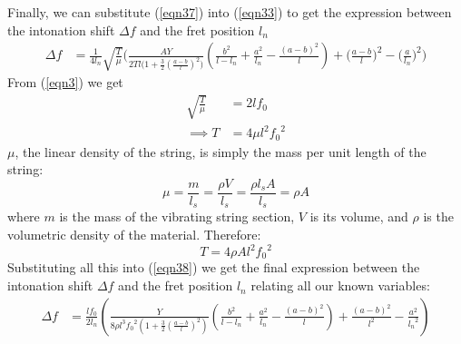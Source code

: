 Finally, we can substitute (\ref{eqn37}) into (\ref{eqn33}) to get the expression between the intonation shift $\Delta f$ and the fret position $l_n$
\begin{align}
    \Delta f &= \frac{1}{4l_n} \sqrt{\frac{T}{\mu}} \bigg( \frac{AY}{2Tl \big(1 + \frac{3}{2}(\frac{a-b}{l})^2\big)} \left( \frac{b^2}{l-l_n} + \frac{a^2}{l_n} - \frac{(a-b)^2}{l} \right) + \Big(\frac{a-b}{l}\Big)^2 - \Big(\frac{a}{l_n}\Big)^2 \bigg) \label{eqn38}
\end{align}
From (\ref{eqn3}) we get
\begin{align*}
    \sqrt{\frac{T}{\mu}} &= 2lf_0 \\
    \implies T &= 4\mu l^2{f_0}^2    
\end{align*}
$\mu$, the linear density of the string, is simply the mass per unit length of the string:
\begin{equation*}
    \mu = \frac{m}{l_s} = \frac{\rho V}{l_s} = \frac{\rho l_s A}{l_s} = \rho A
\end{equation*}
where $m$ is the mass of the vibrating string section, $V$ is its volume, and $\rho$ is the volumetric density of the material. Therefore:
\begin{equation*}
    T = 4\rho A l^2{f_0}^2    
\end{equation*}
Substituting all this into (\ref{eqn38}) we get the final expression between the intonation shift $\Delta f$ and the fret position $l_n$ relating all our known variables:
\begin{align}
    \Delta f &= \frac{l f_0}{2l_n} \left( \frac{Y}{8\rho l^3 {f_0}^2 (1 + \frac{3}{2}(\frac{a-b}{l})^2)} \left( \frac{b^2}{l-l_n} + \frac{a^2}{l_n} - \frac{(a-b)^2}{l} \right) + \frac{(a-b)^2}{l^2} - \frac{a^2}{{l_n}^2} \right) \label{eqn39}
\end{align}